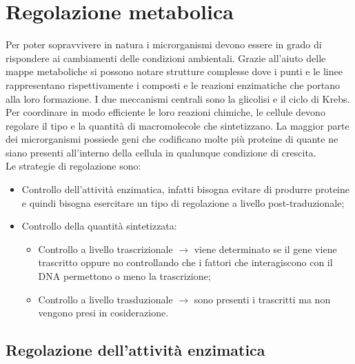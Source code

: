 \chapter{Regolazione metabolica}
Per poter sopravvivere in natura i microrganismi devono essere in grado di rispondere ai cambiamenti delle condizioni ambientali. Grazie all'aiuto delle mappe metaboliche si possono notare strutture complesse dove i punti e le linee rappresentano rispettivamente i composti e le reazioni enzimatiche che portano alla loro formazione. I due meccanismi centrali sono la glicolisi e il ciclo di Krebs. 
\\Per coordinare in modo efficiente le loro reazioni chimiche, le cellule devono regolare il tipo e la quantità di macromolecole che sintetizzano. La maggior parte dei microrganismi possiede geni che codificano molte più proteine di quante ne siano presenti all'interno della cellula in qualunque condizione di crescita. 
\\Le strategie di regolazione sono: 
\begin{itemize}
    \item Controllo dell'attività enzimatica, infatti bisogna evitare di produrre proteine e quindi bisogna esercitare un tipo di regolazione a livello post-traduzionale; 
    \item Controllo della quantità sintetizzata:
    \begin{itemize}
        \item Controllo a livello trascrizionale $\xrightarrow{}$ viene determinato se il gene viene trascritto oppure no controllando che i fattori che interagiscono con il DNA permettono o meno la trascrizione; 
        \item Controllo a livello trasduzionale $\xrightarrow{}$ sono presenti i trascritti ma non vengono presi in cosiderazione.
    \end{itemize}
\end{itemize}
\section{Regolazione dell'attività enzimatica}
